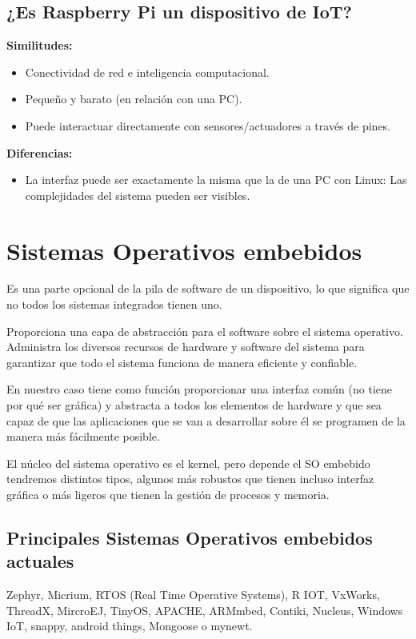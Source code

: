 \documentclass[12pt, twoside, openright]{report} %
\begin{document}
\begin{figure}[H]
	{\def\svgwidth{.8\textwidth}
     }
\end{figure}
\pagebreak
\subsection{¿Es Raspberry Pi un dispositivo de IoT?}

\textbf{Similitudes:}
\begin{itemize}
	\item Conectividad de red e inteligencia computacional.
	\item Pequeño y barato (en relación con una PC).
	\item Puede interactuar directamente con sensores/actuadores a través de pines.
\end{itemize}


\textbf{Diferencias:}
\begin{itemize}
	\item La interfaz puede ser exactamente la misma que la de una PC con Linux: Las complejidades del sistema pueden ser visibles.
\end{itemize}

\section{Sistemas Operativos embebidos}
Es una parte opcional de la pila de software de un dispositivo, lo que significa que no todos los sistemas integrados tienen uno.

Proporciona una capa de abstracción para el software sobre el sistema operativo.
Administra los diversos recursos de hardware y software del sistema para garantizar que todo el sistema funciona de manera eficiente y confiable.

En nuestro caso tiene como función proporcionar una interfaz común (no tiene por qué ser gráfica) y abstracta a todos los elementos de hardware y que sea capaz de que las aplicaciones que se van a desarrollar sobre él se programen de la manera más fácilmente posible.

El núcleo del sistema operativo es el kernel, pero depende el SO embebido tendremos distintos tipos, algunos más robustos que tienen incluso interfaz gráfica o más ligeros que tienen la gestión de procesos y memoria.

\subsection{Principales Sistemas Operativos embebidos actuales}
Zephyr, Micrium, RTOS (Real Time Operative Systems), R IOT, VxWorks, ThreadX, MircroEJ, TinyOS, APACHE, ARMmbed, Contiki, Nucleus, Windows IoT, snappy, android things, Mongoose o mynewt.
\pagebreak
\end{document}
